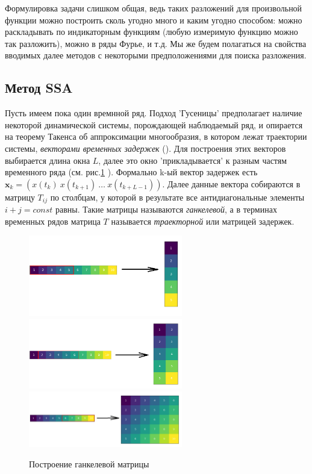 	    	Формулировка задачи слишком общая, ведь таких разложений для произвольной функции можно построить сколь угодно много и каким угодно способом: можно раскладывать по индикаторным функциям (любую измеримую функцию можно так разложить), можно в ряды Фурье, и т.д. Мы же будем полагаться на свойства вводимых далее методов с некоторыми предположениями для поиска разложения.
	    
	    	\subsection*{Метод SSA}
	    	
	    	Пусть имеем пока один времнной ряд. Подход 'Гусеницы' предполагает наличие некоторой динамической системы, порождающей наблюдаемый ряд, и опирается на теорему Такенса об аппроксимации многообразия, в котором лежат траектории системы, \textit{векторами временных задержек} (\cite{citeulike:2735031}). Для построения этих векторов выбирается длина окна $ L $, далее это окно 'прикладывается' к разным частям временного ряда (см. рис.\ref{pic:hankel_build} ). Формально k-ый вектор задержек есть $ \mathbf{x}_k = ( x(t_k) \  x(t_{k+1}) \  \ldots \  x(t_{k + L - 1}) ) $. Далее данные вектора собираются в матрицу $ T_{ij} $ по столбцам, у которой в результате все антидиагональные элементы $ i + j = const $ равны. Такие матрицы называются \textit{ганкелевой}, а в терминах временных рядов матрица $ T $ называется \textit{траекторной} или матрицей задержек.
	    	
	    	\begin{figure}
	    		\centering
	    		\includegraphics[width=0.6\textwidth, keepaspectratio]{../figs/first_round}
	    		\includegraphics[width=0.6\textwidth, keepaspectratio]{../figs/second_round.png}
	    		\includegraphics[width=0.6\textwidth, keepaspectratio]{../figs/last_round.png}
	    		\caption{Построение ганкелевой матрицы}\label{pic:hankel_build}
	    	\end{figure}
	    	
